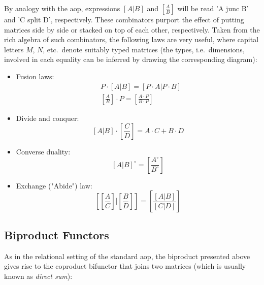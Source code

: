 \documentclass[
  oneside,
  11pt, a4paper,
  footinclude=true,
  headinclude=true,
  cleardoublepage=empty
]{scrbook}
\theoremstyle{definition}
\theoremstyle{definition}
\begin{document}
        By analogy with the \gls{aop}, expressions $\left[A | B\right]$ and $\left[\tfrac{A}{B}\right]$ will be read 'A junc B' and 'C split D', respectively. These combinators purport the effect of putting matrices side by side or stacked on top of each other, respectively. Taken from the rich algebra of such combinators, the following laws are very useful, where capital letters $M$, $N$, etc.\ denote suitably typed matrices (the types, i.e.\ dimensions, involved in each equality can be inferred by drawing the corresponding diagram):
        
        \begin{itemize}
            \item Fusion laws:
            \begin{align}\label{fusion}
                & P \cdot \left[A|B\right] = \left[P \cdot A | P \cdot B\right] \\
                & \left[\frac{A}{B}\right] \cdot P = \left[\frac{A \cdot P}{B \cdot P}\right]
            \end{align}
            \item Divide and conquer:
            \begin{equation}\label{div-conq}
                \left[A | B\right] \cdot \left[\frac{C}{D}\right] = A \cdot C + B \cdot D
            \end{equation}
            \item Converse duality:
            \begin{equation}
                \left[A | B\right]^\circ = \left[\frac{A^\circ}{B^\circ}\right]
            \end{equation}
            \item Exchange ("Abide") law:
            \begin{equation}\label{abide}
                \left[\left[\frac{A}{C}\right] | \left[\frac{B}{D}\right]\right] = \left[\frac{\left[A | B\right]}{\left[C | D\right]}\right]
            \end{equation}
        \end{itemize}{}
        
        \subsection{Biproduct Functors}
        
        As in the relational setting of the standard \gls{aop}, the biproduct presented above gives rise to the coproduct bifunctor that joins two matrices (which is usually known as \emph{direct sum}):
        
\end{document}
